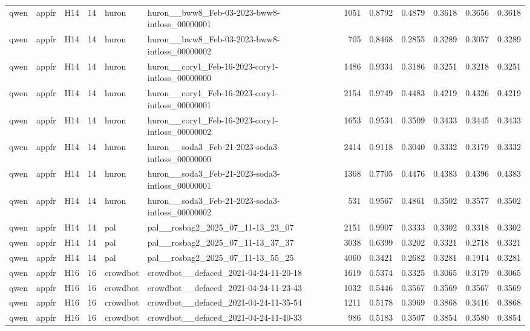 \begin{table}[tbp]
\begin{tabular}{lllrllrrrrrr}
qwen & appfr & H14 & 14 & huron & huron\_\_bww8\_Feb-03-2023-bww8-intloss\_00000001 & 1051 & 0.8792 & 0.4879 & 0.3618 & 0.3656 & 0.3618 \\
qwen & appfr & H14 & 14 & huron & huron\_\_bww8\_Feb-03-2023-bww8-intloss\_00000002 & 705 & 0.8468 & 0.2855 & 0.3289 & 0.3057 & 0.3289 \\
qwen & appfr & H14 & 14 & huron & huron\_\_cory1\_Feb-16-2023-cory1-intloss\_00000000 & 1486 & 0.9334 & 0.3186 & 0.3251 & 0.3218 & 0.3251 \\
qwen & appfr & H14 & 14 & huron & huron\_\_cory1\_Feb-16-2023-cory1-intloss\_00000001 & 2154 & 0.9749 & 0.4483 & 0.4219 & 0.4326 & 0.4219 \\
qwen & appfr & H14 & 14 & huron & huron\_\_cory1\_Feb-16-2023-cory1-intloss\_00000002 & 1653 & 0.9534 & 0.3509 & 0.3433 & 0.3445 & 0.3433 \\
qwen & appfr & H14 & 14 & huron & huron\_\_soda3\_Feb-21-2023-soda3-intloss\_00000000 & 2414 & 0.9118 & 0.3040 & 0.3332 & 0.3179 & 0.3332 \\
qwen & appfr & H14 & 14 & huron & huron\_\_soda3\_Feb-21-2023-soda3-intloss\_00000001 & 1368 & 0.7705 & 0.4476 & 0.4383 & 0.4396 & 0.4383 \\
qwen & appfr & H14 & 14 & huron & huron\_\_soda3\_Feb-21-2023-soda3-intloss\_00000002 & 531 & 0.9567 & 0.4861 & 0.3502 & 0.3577 & 0.3502 \\
qwen & appfr & H14 & 14 & pal & pal\_\_rosbag2\_2025\_07\_11-13\_23\_07 & 2151 & 0.9907 & 0.3333 & 0.3302 & 0.3318 & 0.3302 \\
qwen & appfr & H14 & 14 & pal & pal\_\_rosbag2\_2025\_07\_11-13\_37\_37 & 3038 & 0.6399 & 0.3202 & 0.3321 & 0.2718 & 0.3321 \\
qwen & appfr & H14 & 14 & pal & pal\_\_rosbag2\_2025\_07\_11-13\_55\_25 & 4060 & 0.3421 & 0.2682 & 0.3281 & 0.1914 & 0.3281 \\
qwen & appfr & H16 & 16 & crowdbot & crowdbot\_\_defaced\_2021-04-24-11-20-18 & 1619 & 0.5374 & 0.3325 & 0.3065 & 0.3179 & 0.3065 \\
qwen & appfr & H16 & 16 & crowdbot & crowdbot\_\_defaced\_2021-04-24-11-23-43 & 1032 & 0.5446 & 0.3567 & 0.3569 & 0.3567 & 0.3569 \\
qwen & appfr & H16 & 16 & crowdbot & crowdbot\_\_defaced\_2021-04-24-11-35-54 & 1211 & 0.5178 & 0.3969 & 0.3868 & 0.3416 & 0.3868 \\
qwen & appfr & H16 & 16 & crowdbot & crowdbot\_\_defaced\_2021-04-24-11-40-33 & 986 & 0.5183 & 0.3507 & 0.3854 & 0.3580 & 0.3854 \\

\end{tabular}
\end{table}
